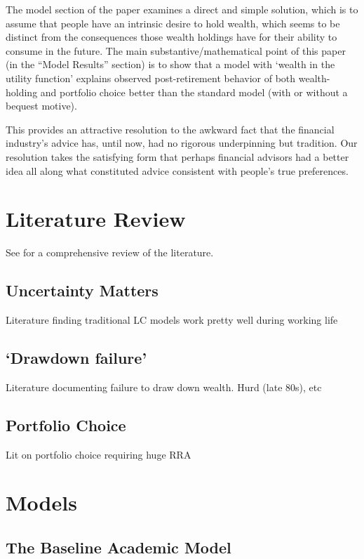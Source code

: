 \documentclass{article}
\begin{document}
The model section of the paper examines a direct and simple solution, which is to assume that people have an intrinsic desire to hold wealth, which seems to be distinct from the consequences those wealth holdings have for their ability to consume in the future. The main substantive/mathematical point of this paper (in the ``Model Results'' section) is to show that a model with `wealth in the utility function' explains observed post-retirement behavior of both wealth-holding and portfolio choice better than the standard model (with or without a bequest motive).

This provides an attractive resolution to the awkward fact that the financial industry's advice has, until now, had no rigorous underpinning but tradition. Our resolution takes the satisfying form that perhaps financial advisors had a better idea all along what constituted advice consistent with people's true preferences.

\section{Literature Review}

See \cite{Dynan_2002} for a comprehensive review of the literature.

\subsection{Uncertainty Matters}

Literature finding traditional LC models work pretty well during working life

\subsection{`Drawdown failure'}

Literature documenting failure to draw down wealth. Hurd (late 80s), etc

\subsection{Portfolio Choice}

Lit on portfolio choice requiring huge RRA

\section{Models}

\subsection{The Baseline Academic Model}
\end{document}
